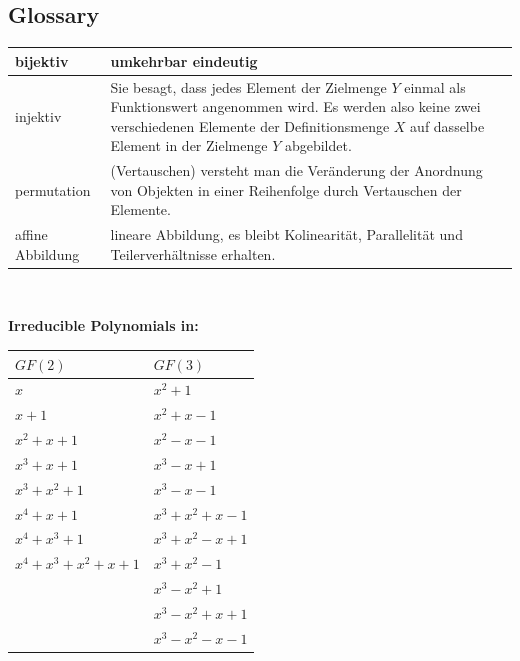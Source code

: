 \subsection{Glossary}%
\begin{minipage}{12.5cm}
\begin{tabular}[]{|l |p{9cm}| }
	\hline
	bijektiv & umkehrbar eindeutig\\
	\hline
	injektiv & Sie besagt, dass jedes Element der Zielmenge $Y$ einmal als Funktionswert angenommen wird.
	Es werden also keine zwei verschiedenen Elemente der Definitionsmenge $X$ auf dasselbe Element in der Zielmenge $Y$ abgebildet.\\
	\hline
	permutation & (Vertauschen) versteht man die Ver\"anderung der Anordnung von Objekten in einer Reihenfolge durch Vertauschen der Elemente.\\
	\hline
	affine Abbildung & lineare Abbildung, es bleibt Kolinearit\"at, Parallelit\"at und Teilerverh\"altnisse erhalten. \\
	\hline
\end{tabular}\\

\end{minipage}
\begin{minipage}{6cm}
\textbf{Irreducible Polynomials in:}\\
\begin{tabular}{l l}
	$GF(2)$				&	$GF(3)$\\
	\hline
	$x$					&	$x^2+1$\\
	$x+1$				&	$x^2+x-1$\\
	$x^2+x+1$			&	$x^2-x-1$\\
	$x^3+x+1$			&	$x^3-x+1$\\
	$x^3+x^2+1$			&	$x^3-x-1$\\
	$x^4+x+1$			&	$x^3+x^2+x-1$\\
	$x^4+x^3+1$			&	$x^3+x^2-x+1$\\
	$x^4+x^3+x^2+x+1$	&	$x^3+x^2-1$\\ 
						&	$x^3-x^2+1$\\ 
						&	$x^3-x^2+x+1$\\ 
						&	$x^3-x^2-x-1$\\ 
\end{tabular}
\end{minipage} \\

